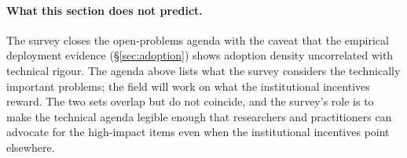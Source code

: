 \paragraph{What this section does not predict.}
The survey closes the open-problems agenda
with the caveat that the empirical
deployment evidence (\S\ref{sec:adoption})
shows adoption density uncorrelated with
technical rigour. The agenda above lists
what the survey considers the technically
important problems; the field will work on
what the institutional incentives reward. The
two sets overlap but do not coincide, and the
survey's role is to make the technical agenda
legible enough that researchers and
practitioners can advocate for the
high-impact items even when the institutional
incentives point elsewhere.
